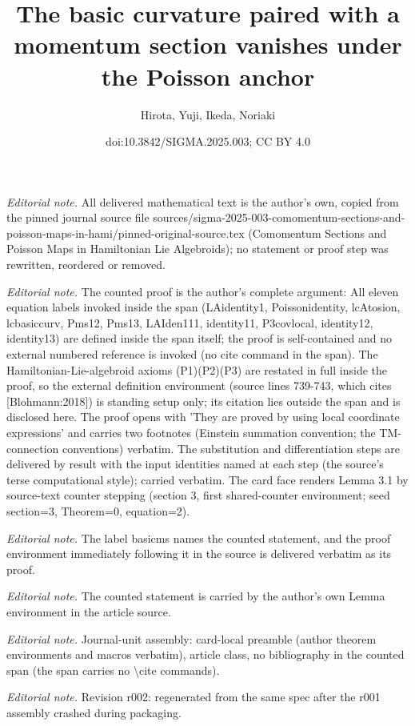 \documentclass[10pt,a4paper]{article}
\title{The basic curvature paired with a momentum section vanishes under the Poisson anchor}
\author{Hirota, Yuji, Ikeda, Noriaki}
\date{doi:10.3842/SIGMA.2025.003; CC BY 4.0}
\numberwithin{equation}{section}
\begin{document}
\maketitle
\setcounter{section}{3}
\setcounter{Theorem}{0}
\setcounter{equation}{2}
\noindent\textit{Editorial note.} All delivered mathematical text is the author's own, copied from the pinned journal source file sources/sigma-2025-003-comomentum-sections-and-poisson-maps-in-hami/pinned-original-source.tex (Comomentum Sections and Poisson Maps in Hamiltonian Lie Algebroids); no statement or proof step was rewritten, reordered or removed.\par\medskip
\noindent\textit{Editorial note.} The counted proof is the author's complete argument: All eleven equation labels invoked inside the span (LAidentity1, Poissonidentity, lcAtosion, lcbasiccurv, Pms12, Pms13, LAIden111, identity11, P3covlocal, identity12, identity13) are defined inside the span itself; the proof is self-contained and no external numbered reference is invoked (no cite command in the span). The Hamiltonian-Lie-algebroid axioms (P1)(P2)(P3) are restated in full inside the proof, so the external definition environment (source lines 739-743, which cites [Blohmann:2018]) is standing setup only; its citation lies outside the span and is disclosed here. The proof opens with 'They are proved by using local coordinate expressions' and carries two footnotes (Einstein summation convention; the TM-connection conventions) verbatim. The substitution and differentiation steps are delivered by result with the input identities named at each step (the source's terse computational style); carried verbatim. The card face renders Lemma 3.1 by source-text counter stepping (section 3, first shared-counter environment; seed section=3, Theorem=0, equation=2).\par\medskip
\noindent\textit{Editorial note.} The label basicms names the counted statement, and the proof environment immediately following it in the source is delivered verbatim as its proof.\par\medskip
\noindent\textit{Editorial note.} The counted statement is carried by the author's own Lemma environment in the article source.\par\medskip
\noindent\textit{Editorial note.} Journal-unit assembly: card-local preamble (author theorem environments and macros verbatim), article class, no bibliography in the counted span (the span carries no \textbackslash{}cite commands).\par\medskip
\noindent\textit{Editorial note.} Revision r002: regenerated from the same spec after the r001 assembly crashed during packaging.\par\medskip
\end{document}
